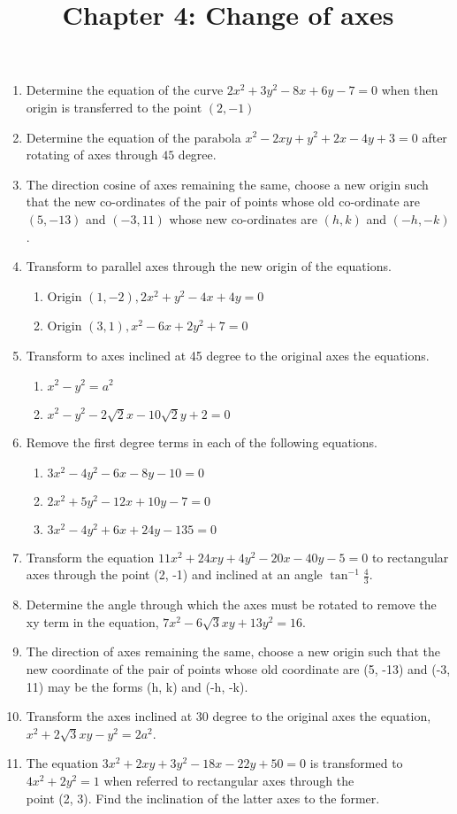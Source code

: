 \documentclass[11 pt]{article}
\title{Chapter 4: Change of axes}
\begin{document}
\maketitle

\begin{enumerate}
	\item Determine the equation of the curve $2x^2+3y^2-8x+6y-7=0$ when then origin is transferred to the point $(2, -1)$
	\item Determine the equation of the parabola $x^2-2xy+y^2+2x-4y+3=0$ after rotating of axes through $45$ degree.
	\item The direction cosine of axes remaining the same, choose a new origin such that the new co-ordinates of the pair of points whose old co-ordinate are $(5, -13)$ and $(-3, 11)$ whose new co-ordinates are $(h, k)$ and $(-h, -k)$.
	\item Transform to parallel axes through the new origin of the equations.
		\begin{enumerate}
			\item Origin $(1, -2), 2x^2+y^2-4x+4y=0$
			\item Origin $(3, 1), x^2-6x+2y^2+7=0$
		\end{enumerate}
	\item Transform to axes inclined at 45 degree to the original axes the equations.
		\begin{enumerate}
			\item $x^2-y^2=a^2$
			\item $x^2-y^2-2\sqrt{2}x-10\sqrt{2}y+2=0$
		\end{enumerate}
	\item Remove the first degree terms in each of the following equations.
		\begin{enumerate}
			\item $3x^2-4y^2-6x-8y-10=0$
			\item $2x^2+5y^2-12x+10y-7=0$
			\item $3x^2-4y^2+6x+24y-135=0$
		\end{enumerate}
	\item Transform the equation $11x^2+24xy+4y^2-20x-40y-5=0$ to rectangular axes through the point (2, -1) and inclined at an angle $\tan^{-1}\frac{4}{3}$.
	\item Determine the angle through which the axes must be rotated to remove the xy term in the equation, $7x^2-6\sqrt{3}xy+13y^2=16$.
	\item The direction of axes remaining the same, choose a new origin such that the new coordinate of the pair of points whose old coordinate are (5, -13) and (-3, 11) may be the forms (h, k) and (-h, -k).
	\item Transform the axes inclined at 30 degree to the original axes the equation, $x^2+2\sqrt{3}xy-y^2=2a^2$.
	\item The equation $3x^2+2xy+3y^2-18x-22y+50=0$ is transformed to $4x^2+2y^2=1$ when referred to rectangular axes through the\\
	point (2, 3). Find the inclination of the latter axes to the former.
\end{enumerate}
\end{document}
